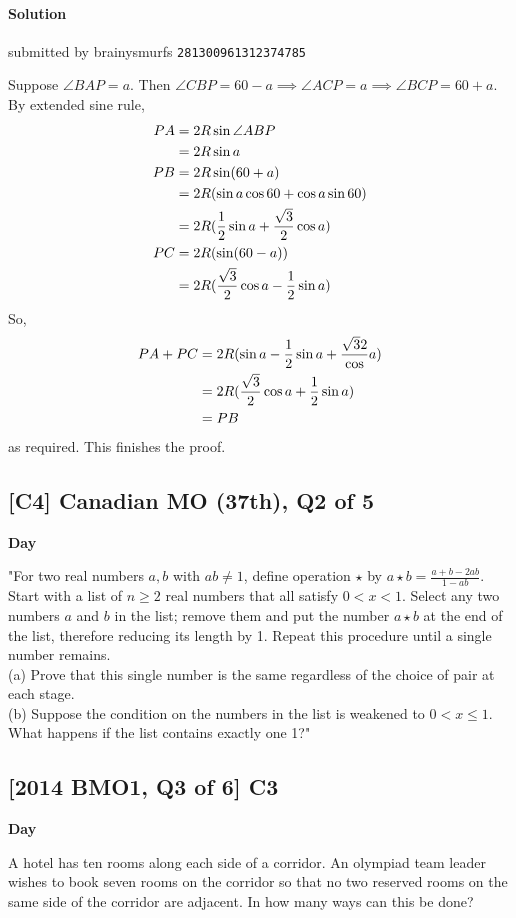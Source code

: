 \documentclass[10pt]{article}
\newcommand{\themonth}{March}
\newcommand{\theyear}{2019}
\newcounter{day}
\newcounter{solution}
\newcounter{datenumber}
\newcommand{\problem}[4][0]{
	\newpage
	\subsection{[#3] \space #2} \hfill 
	{\large\textbf{Day \arabic{day}}} %
	\begin{flushleft} #4 \end{flushleft}
	\vspace{1em}
	\addtocounter{day}{1}
	\addtocounter{datenumber}{1}
	\setcounter{solution}{1}
}
\newcommand{\solution}[4][0]{
	\paragraph{Solution \arabic{solution}} \hfill submitted by #2 \hfill \texttt{#3}
	\begin{flushleft} #4 \end{flushleft}
	\addtocounter{solution}{1}
	\vspace{1em}
}
\begin{document}
\solution[37]{brainysmurfs}{281300961312374785}{
Suppose $\angle BAP = a$. Then $\angle CBP = 60 - a \implies \angle ACP = a \implies \angle BCP = 60 + a$. \\
By extended sine rule, 
\begin{equation}
$$\begin{align*}
PA &= 2R \sin \angle ABP\\
&= 2R \sin a\\
PB &= 2R \sin (60 + a) \\
&= 2R (\sin a \cos 60 + \cos a \sin 60)\\
&= 2R(\frac{1}{2}\sin a + \frac{\sqrt{3}}{2}\cos a)\\
PC &= 2R(\sin(60 - a))\\
&= 2R(\frac{\sqrt{3}}{2} \cos a - \frac{1}{2}\sin a)
\end{align*}$$\end{equation}
So, 
\begin{equation}
$$\begin{align*}
PA+PC &= 2R(\sin a - \frac{1}{2} \sin a + \frac{\sqrt{3}{2}} \cos a)\\
&= 2R(\frac{\sqrt{3}}{2} \cos a + \frac{1}{2} \sin a)\\
&= PB \\
\end{align*}$$
\end{equation}
as required. This finishes the proof. 
}

\renewcommand{\themonth}{May}
\setcounter{datenumber}{1}

\problem[38]{2007 Canadian MO (37th), Q2 of 5}{C4}{"For two real numbers $a,b$ with $ab \neq 1$, define operation $\star$ by $a \star b = \frac{a + b - 2ab}{1 - ab}$. Start with a list of $n \geq 2$ real numbers that all satisfy $0 < x < 1$. Select any two numbers $a$ and $b$ in the list; remove them and put the number $a \star b$ at the end of the list, therefore reducing its length by 1. Repeat this procedure until a single number remains.\\
	(a) Prove that this single number is the same regardless of the choice of pair at each stage.\\
	(b) Suppose the condition on the numbers in the list is weakened to $0 < x \leq 1$. What happens if the list contains exactly one 1?"}
  
\problem[39]{C3}{2014 BMO1, Q3 of 6}{A hotel has ten rooms along each side of a corridor. An olympiad team leader wishes to book seven rooms on the corridor so that no two reserved rooms on the same side of the corridor are adjacent. In how many ways can this be done?}
\end{document}

